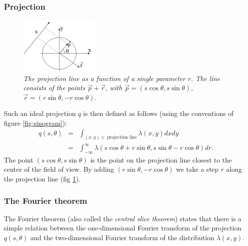 \subsubsection{Projection}
\begin{figure}[tb]
\centering
\includegraphics[width=0.35\textwidth]{figs/fig_fbp_math.pdf}
\caption{\label{fig:fbp_math} \emph{The projection line as a function of a
single parameter $r$. The line consists of the points $\vec{p} + \vec{r}$,
with $\vec{p} = (s \cos \theta, s \sin \theta)$, $\vec{r} = (r \sin \theta, - r
\cos \theta)$.}}
\end{figure}

Such an ideal projection $q$ is then defined as follows (using the conventions
of figure \ref{fig:sinogram}):
\begin{align}
q(s, \theta) & = &\int_{(x,y) \in \; \mbox{projection line}}
                  \lambda(x,y) dx dy\\
             & = &\int_{-\infty}^{\infty}
        \lambda(s \cos \theta + r \sin \theta,
                s \sin \theta - r \cos \theta) dr. \label{eq:jnidealproj}
\end{align}
The point $(s \cos \theta, s \sin \theta)$ is the point on the projection line
closest to the center of the field of view.  By adding $(r \sin \theta, - r
\cos \theta)$ we take a step $r$ along the projection line (fig
\ref{fig:fbp_math}).


\subsubsection{The Fourier theorem}
The Fourier theorem (also called the {\em central slice theorem})
states that there is a simple relation between the one-dimensional
Fourier transform of the projection $q(s, \theta)$ and the
two-dimensional Fourier transform of the distribution $\lambda(x,y)$.

